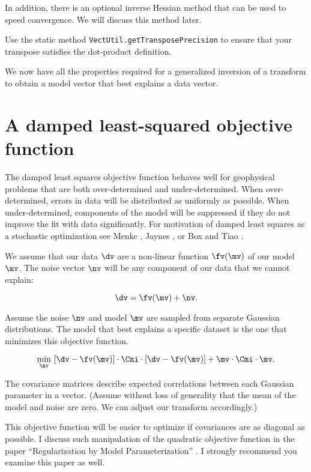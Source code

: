 \documentclass[12pt]{article}
\begin{document}
\noindent In addition, there is an optional
inverse Hessian method that can be used to
speed convergence.  We will discuss this
method later.

Use the static method
\texttt{VectUtil.getTransposePrecision} to
ensure that your transpose satisfies the
dot-product definition.

We now have all the properties required for a
generalized inversion of a transform to
obtain a model vector that best explains a
data vector.

\section {A damped least-squared objective
function}

The damped least squares objective function
behaves well for geophysical problems that
are both over-deter\-mined and
under-deter\-mined.  When over-deter\-mined,
errors in data will be distributed as
uniformly as possible.  When
under-deter\-mined, components of the model
will be suppressed if they do not improve the
fit with data significantly.  For motivation
of damped least squares as a stochastic
optimization see Menke \cite{menke}, Jaynes
\cite{jaynes}, or Box and Tiao
\cite{boxandtiao}.

We assume that our data $\dv$ are a
non-linear function $\fv(\mv)$ of our model
$\mv$.  The noise vector $\nv$ will be any
component of our data that we cannot explain:

\begin{equation}
\dv = \fv ( \mv ) + \nv.  
\end{equation}

\noindent Assume the noise $\nv$ and model
$\mv$ are sampled from separate Gaussian
distributions.  The model that best explains
a specific dataset is the one that minimizes
this objective function.

\begin{equation}
\label{eq:obj}
\min_{\mv} ~ [\dv - \fv (\mv) ] \cdot \Cni \cdot [\dv - \fv (\mv) ]
            + \mv \cdot \Cmi \cdot \mv .
\end{equation}

\noindent The covariance matrices describe
expected correlations between each Gaussian
parameter in a vector.  (Assume without loss
of generality that the mean of the model and
noise are zero.  We can adjust our transform
accordingly.)

This objective function will be easier to
optimize if covariances are as diagonal as
possible.  I discuss such manipulation of the
quadratic objective function in the paper
``Regularization by Model Parameterization''
\cite{harlan-model}.  I strongly recommend
you examine this paper as well.
\end{document}
